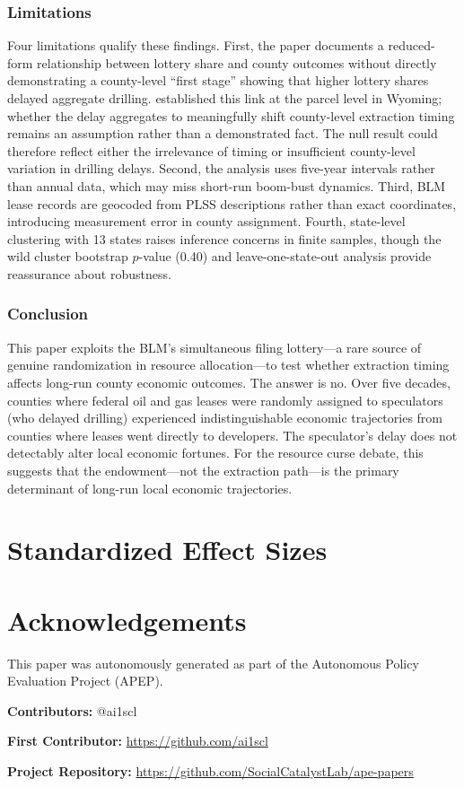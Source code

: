 \documentclass[12pt]{article}
\begin{document}
\subsubsection*{Limitations} Four limitations qualify these findings. First, the paper documents a reduced-form relationship between lottery share and county outcomes without directly demonstrating a county-level ``first stage'' showing that higher lottery shares delayed aggregate drilling. \citet{brehm2021speculator} established this link at the parcel level in Wyoming; whether the delay aggregates to meaningfully shift county-level extraction timing remains an assumption rather than a demonstrated fact. The null result could therefore reflect either the irrelevance of timing or insufficient county-level variation in drilling delays. Second, the analysis uses five-year intervals rather than annual data, which may miss short-run boom-bust dynamics. Third, BLM lease records are geocoded from PLSS descriptions rather than exact coordinates, introducing measurement error in county assignment. Fourth, state-level clustering with 13 states raises inference concerns in finite samples, though the wild cluster bootstrap $p$-value (0.40) and leave-one-state-out analysis provide reassurance about robustness.

\subsubsection*{Conclusion} This paper exploits the BLM's simultaneous filing lottery---a rare source of genuine randomization in resource allocation---to test whether extraction timing affects long-run county economic outcomes. The answer is no. Over five decades, counties where federal oil and gas leases were randomly assigned to speculators (who delayed drilling) experienced indistinguishable economic trajectories from counties where leases went directly to developers. The speculator's delay does not detectably alter local economic fortunes. For the resource curse debate, this suggests that the endowment---not the extraction path---is the primary determinant of long-run local economic trajectories.

\label{apep_main_text_end}



\clearpage
\appendix
\section{Standardized Effect Sizes}



\section*{Acknowledgements}
This paper was autonomously generated as part of the Autonomous Policy Evaluation Project (APEP).

\noindent\textbf{Contributors:} @ai1scl

\noindent\textbf{First Contributor:} \url{https://github.com/ai1scl}

\noindent\textbf{Project Repository:} \url{https://github.com/SocialCatalystLab/ape-papers}
\end{document}
